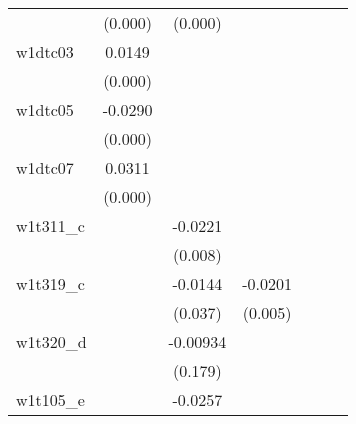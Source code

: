 {\begin{tabular}{l*{6}{c}}
            &     (0.000)         &     (0.000)         &                     &                     &                     &                     \\
[1em]
w1dtc03     &      0.0149\sym{***}&                     &                     &                     &                     &                     \\
            &     (0.000)         &                     &                     &                     &                     &                     \\
[1em]
w1dtc05     &     -0.0290\sym{***}&                     &                     &                     &                     &                     \\
            &     (0.000)         &                     &                     &                     &                     &                     \\
[1em]
w1dtc07     &      0.0311\sym{***}&                     &                     &                     &                     &                     \\
            &     (0.000)         &                     &                     &                     &                     &                     \\
[1em]
w1t311\_c    &                     &     -0.0221\sym{***}&                     &                     &                     &                     \\
            &                     &     (0.008)         &                     &                     &                     &                     \\
[1em]
w1t319\_c    &                     &     -0.0144\sym{**} &     -0.0201\sym{***}&                     &                     &                     \\
            &                     &     (0.037)         &     (0.005)         &                     &                     &                     \\
[1em]
w1t320\_d    &                     &    -0.00934         &                     &                     &                     &                     \\
            &                     &     (0.179)         &                     &                     &                     &                     \\
[1em]
w1t105\_e    &                     &     -0.0257\sym{***}&                     &                     &                     &                     \\

\end{tabular}}
